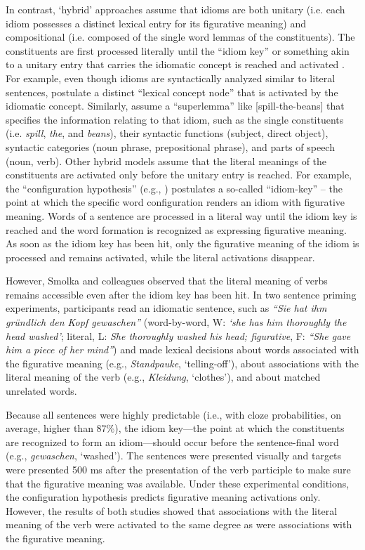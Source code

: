 In contrast, ‘hybrid’ approaches assume that idioms are both unitary (i.e. each idiom possesses a distinct lexical entry for its figurative meaning) and compositional (i.e. composed of the single word lemmas of the constituents). The constituents are first processed literally until the ``idiom key'' or something akin to a unitary entry that carries the idiomatic concept is reached and activated \citep{cacciari:1988,caillies:2007,connine:1992,cutting:1997,gibbs:1989,holsinger:2013,sprenger:2006,titone:1999}. For example, even though idioms are syntactically analyzed similar to literal sentences, \citealt{cutting:1997} postulate a distinct ``lexical concept node'' that is activated by the idiomatic concept. Similarly, \citealt{sprenger:2006} assume a ``superlemma'' like [spill-the-beans] that specifies the information relating to that idiom, such as the single constituents (i.e. \textit{spill}, \textit{the}, and \textit{beans}), their syntactic functions (subject, direct object), syntactic categories (noun phrase, prepositional phrase), and parts of speech (noun, verb). Other hybrid models assume that the literal meanings of the constituents are activated only before the unitary entry is reached. For example, the ``configuration hypothesis'' (e.g., \citealt{cacciari:1988}) postulates a so-called ``idiom-key'' – the point at which the specific word configuration renders an idiom with figurative meaning. Words of a sentence are processed in a literal way until the idiom key is reached and the word formation is recognized as expressing figurative meaning. As soon as the idiom key has been hit, only the figurative meaning of the idiom is processed and remains activated, while the literal activations disappear. 

However, Smolka and colleagues \citep{rabanus:2008,smolka:2007} observed that the literal meaning of verbs remains accessible even after the idiom key has been hit. In two sentence priming experiments, participants read an idiomatic sentence, such as \textit{``Sie hat ihm gründlich den Kopf gewaschen''} (word-by-word, W: \textit{‘she has him thoroughly the head washed’}; literal, L: \textit{She thoroughly washed his head; figurative}, F: \textit{``She gave him a piece of her mind''}) and made lexical decisions about words associated with the figurative meaning (e.g., \textit{Standpauke}, ‘telling-off’), about associations with the literal meaning of the verb (e.g., \textit{Kleidung}, ‘clothes’), and about matched unrelated words. 

Because all sentences were highly predictable (i.e., with cloze probabilities, on average, higher than 87\%), the idiom key—the point at which the constituents are recognized to form an idiom—should occur before the sentence-final word (e.g., \textit{gewaschen}, ‘washed’). The sentences were presented visually and targets were presented 500 ms after the presentation of the verb participle to make sure that the figurative meaning was available. Under these experimental conditions, the configuration hypothesis \citep{cacciari:1988} predicts figurative meaning activations only.  However, the results of both studies showed that associations with the literal meaning of the verb were activated to the same degree as were associations with the figurative meaning.  

